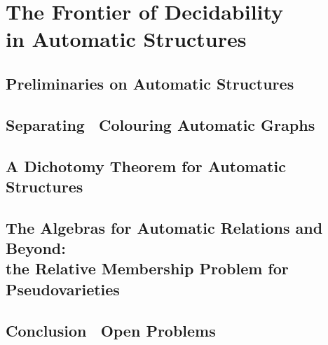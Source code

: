\documentclass[a4paper,sfsidenotes,twoside,justified]{tufte-book-custom}
\begin{document}
\part[The Frontier of Decidability in Automatic Structures]{The Frontier of Decidability\\in Automatic Structures}

\chapter{Preliminaries on Automatic Structures}

\chapter{Separating \fancyand~Colouring Automatic Graphs}

\chapter{A Dichotomy Theorem for Automatic Structures}

\chapter{The Algebras for Automatic Relations and Beyond:\\the Relative Membership Problem for Pseudovarieties}

\chapter{Conclusion \fancyand~Open Problems}


\backmatter



\end{document}
